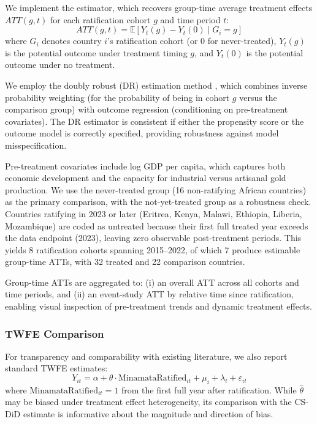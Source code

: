 \documentclass[12pt]{article}
\newcommand{\E}{\mathbb{E}}
\begin{document}
We implement the \citet{callaway2021difference} estimator, which recovers group-time average treatment effects $ATT(g,t)$ for each ratification cohort $g$ and time period $t$:
\begin{equation}
\label{eq:cs_did}
ATT(g,t) = \E\left[Y_t(g) - Y_t(0) \mid G_i = g\right]
\end{equation}
where $G_i$ denotes country $i$'s ratification cohort (or 0 for never-treated), $Y_t(g)$ is the potential outcome under treatment timing $g$, and $Y_t(0)$ is the potential outcome under no treatment.

We employ the doubly robust (DR) estimation method \citep{santanna2020doubly}, which combines inverse probability weighting (for the probability of being in cohort $g$ versus the comparison group) with outcome regression (conditioning on pre-treatment covariates). The DR estimator is consistent if either the propensity score or the outcome model is correctly specified, providing robustness against model misspecification.

Pre-treatment covariates include log GDP per capita, which captures both economic development and the capacity for industrial versus artisanal gold production. We use the never-treated group (16 non-ratifying African countries) as the primary comparison, with the not-yet-treated group as a robustness check. Countries ratifying in 2023 or later (Eritrea, Kenya, Malawi, Ethiopia, Liberia, Mozambique) are coded as untreated because their first full treated year exceeds the data endpoint (2023), leaving zero observable post-treatment periods. This yields 8 ratification cohorts spanning 2015--2022, of which 7 produce estimable group-time ATTs, with 32 treated and 22 comparison countries.

Group-time ATTs are aggregated to: (i) an overall ATT across all cohorts and time periods, and (ii) an event-study ATT by relative time since ratification, enabling visual inspection of pre-treatment trends and dynamic treatment effects.

\subsubsection{TWFE Comparison}

For transparency and comparability with existing literature, we also report standard TWFE estimates:
\begin{equation}
\label{eq:twfe_minamata}
Y_{it} = \alpha + \theta \cdot \text{MinamataRatified}_{it} + \mu_i + \lambda_t + \varepsilon_{it}
\end{equation}
where $\text{MinamataRatified}_{it} = 1$ from the first full year after ratification. While $\hat{\theta}$ may be biased under treatment effect heterogeneity, its comparison with the CS-DiD estimate is informative about the magnitude and direction of bias.
\end{document}
